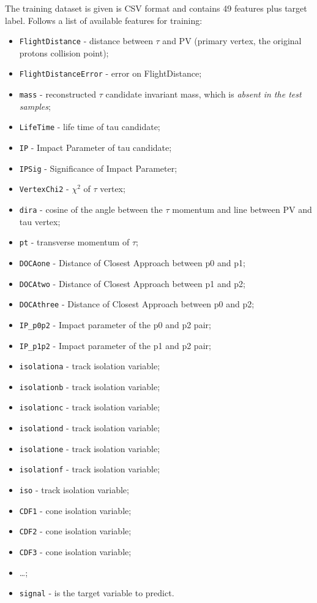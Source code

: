 \documentclass[11pt]{article}
\begin{document}
The training dataset is given is CSV format and contains 49 features plus target
label. Follows a list of available features for training:
\begin{itemize}
	\item \texttt{FlightDistance} - distance between $\tau$ and PV (primary vertex, the
		original protons collision point);
	\item \texttt{FlightDistanceError} - error on FlightDistance;
	\item \texttt{mass} - reconstructed $\tau$ candidate invariant mass, which
		is \textit{absent in the test samples};
	\item \texttt{LifeTime} - life time of tau candidate;
	\item \texttt{IP} - Impact Parameter of tau candidate;
	\item \texttt{IPSig} - Significance of Impact Parameter;
	\item \texttt{VertexChi2} - $\chi^2$ of $\tau$ vertex;
	\item \texttt{dira} - cosine of the angle between the $\tau$ momentum and line
		between PV and tau vertex;
	\item \texttt{pt} - transverse momentum of $\tau$;
	\item \texttt{DOCAone} - Distance of Closest Approach between p0 and p1;
	\item \texttt{DOCAtwo} - Distance of Closest Approach between p1 and p2;
	\item \texttt{DOCAthree} - Distance of Closest Approach between p0 and p2;
	\item \texttt{IP\_p0p2} - Impact parameter of the p0 and p2 pair;
	\item \texttt{IP\_p1p2} - Impact parameter of the p1 and p2 pair;
	\item \texttt{isolationa} - track isolation variable;
	\item \texttt{isolationb} - track isolation variable;
	\item \texttt{isolationc} - track isolation variable;
	\item \texttt{isolationd} - track isolation variable;
	\item \texttt{isolatione} - track isolation variable;
	\item \texttt{isolationf} - track isolation variable;
	\item \texttt{iso} - track isolation variable;
	\item \texttt{CDF1} - cone isolation variable;
	\item \texttt{CDF2} - cone isolation variable;
	\item \texttt{CDF3} - cone isolation variable;
	\item \dots; %
	\item \texttt{signal} - is the target variable to predict.
\end{itemize}
\end{document}
